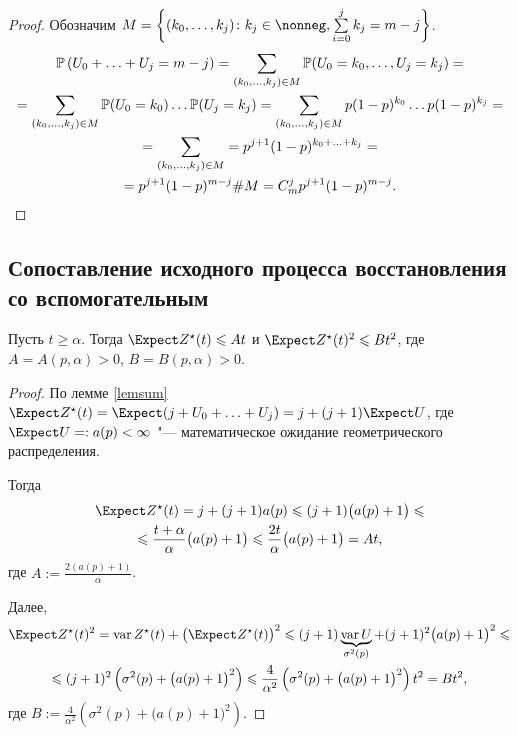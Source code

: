 \begin{proof}
	 Обозначим $M = \left\{ (k_0, \ldots, k_j)\colon k_j \in \nonneg, \sum\limits_{i = 0}^j k_j = m - j\right\}$.
	\begin{multline*}
		\mathbb{P}\left( U_0 + \ldots + U_j = m - j\right) = \sum_{(k_0, \ldots, k_j) \in M} \mathbb{P}(U_0 = k_0, \ldots, U_j = k_j) =\\
		= \sum_{(k_0, \ldots, k_j) \in M} \mathbb{P}(U_0 = k_0)\ldots \mathbb{P}(U_j = k_j) = \sum_{(k_0, \ldots, k_j) \in M} p (1 - p)^{k_0}\ldots p (1 - p)^{k_j} =\\
		= \sum_{(k_0, \ldots, k_j) \in M} = p^{j + 1} (1 - p)^{k_0 + \ldots + k_j} =\\
		= p^{j + 1} (1 - p)^{m - j} \#M = C_m^j p^{j + 1} (1 - p)^{m - j}.
	\end{multline*}
\end{proof}

\subsection{Сопоставление исходного процесса восстановления со вспомогательным}

\begin{lem}\label{est}
	Пусть $t \geqslant \alpha$.
Тогда $\Expect Z^\star(t) \leqslant At$ и $\Expect Z^\star(t)^2 \leqslant B t^2$, где $A = A(p, \alpha) > 0$, $B = B(p, \alpha) > 0$.
\end{lem}

\begin{proof}
	По лемме \ref{lemsum} $\Expect Z^\star(t) = \Expect(j + U_0 + \ldots + U_j) = j + (j + 1) \Expect U$, где $\Expect U =: a(p) < \bes$ "--- математическое ожидание геометрического распределения.

	Тогда
	\begin{multline*}
		\Expect Z^\star(t) = j + (j + 1) a(p) \leqslant (j + 1) \big(a(p) + 1\big) \leqslant\\
		\leqslant \frac{t + \alpha}{\alpha} \big(a(p) + 1\big) \leqslant \frac{2 t}{\alpha} \big( a(p) + 1 \big) = A t,
	\end{multline*}
	где $A := \frac{2 (a(p) + 1)}{\alpha}$.

	Далее,
	\begin{multline*}
		\Expect Z^\star(t)^2 = \var Z^\star(t) + \big(\Expect Z^\star(t) \big)^2 \leqslant (j + 1) \underbrace{\var U}_{\sigma^2(p)} + (j + 1)^2 \big( a(p) + 1 \big)^2 \leqslant\\
		\leqslant (j + 1)^2 \left( \sigma^2(p) + \big( a(p) + 1 \big)^2 \right) \leqslant \frac{4}{\alpha^2} \left( \sigma^2(p) + \big( a(p) + 1 \big)^2 \right) t^2 = B t^2,
	\end{multline*}
	где $B := \frac{4}{\alpha^2} \left( \sigma^2(p) + \big( a(p) + 1 \big)^2 \right)$.
\end{proof}

